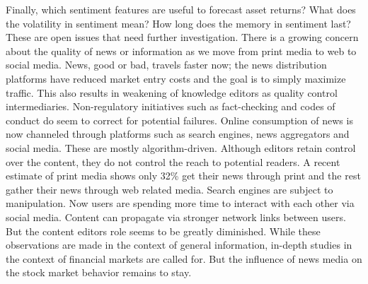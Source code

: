 Finally, which sentiment features are useful to forecast asset returns? What does the volatility in sentiment mean? How long does the memory in sentiment last? These are open issues that need further investigation. There is a growing concern about the quality of news or information as we move from print media to web to social media. News, good or bad, travels faster now; the news distribution platforms have reduced market entry costs and the goal is to simply maximize traffic. This also results in weakening of knowledge editors as quality control intermediaries. Non-regulatory initiatives such as fact-checking and codes of conduct do seem to correct for potential failures. Online consumption of news is now channeled through platforms such as search engines, news aggregators and social media. These are mostly algorithm-driven. Although editors retain control over the content, they do not control the reach to potential readers. A recent estimate of print media shows only 32\% get their news through print and the rest gather their news through web related media. Search engines are subject to manipulation. Now users are spending more time to interact with each other via social media. Content can propagate via stronger network links between users. But the content editors role seems to be greatly diminished. While these observations are made in the context of general information, in-depth studies in the context of financial markets are called for. But the influence of news media on the stock market behavior remains to stay.